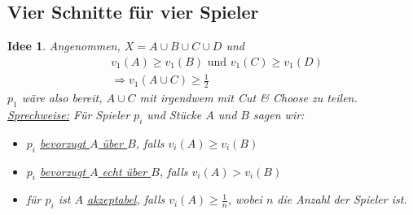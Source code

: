 \documentclass[a4paper,10pt]{scrartcl}
\newtheorem*{idee}{Idee}
\begin{document}
\subsection{Vier Schnitte für vier Spieler}
\begin{idee}
 Angenommen, $X=A\cup B\cup C\cup D$ und\begin{eqnarray*}
                                        &v_1(A)\geq v_1(B)\text{ und }v_1(C)\geq v_1(D)\\
                                        &\Rightarrow v_1(A\cup C)\geq\frac{1}{2}
                                        \end{eqnarray*}
 $p_1$ wäre also bereit, $A\cup C$ mit irgendwem mit Cut \& Choose zu teilen.\\
 \underline{Sprechweise:} Für Spieler $p_i$ und Stücke $A$ und $B$ sagen wir:
 \begin{itemize}
  \item $p_i$ \underline{bevorzugt $A$ über $B$}, falls $v_i(A)\geq v_i(B)$
  \item $p_i$ \underline{bevorzugt $A$ echt über $B$}, falls $v_i(A)>v_i(B)$
  \item für $p_i$ ist $A$ \underline{akzeptabel}, falls $v_i(A)\geq\frac{1}{n}$, wobei $n$ die Anzahl der Spieler ist.
 \end{itemize}
\end{idee}
\end{document}
